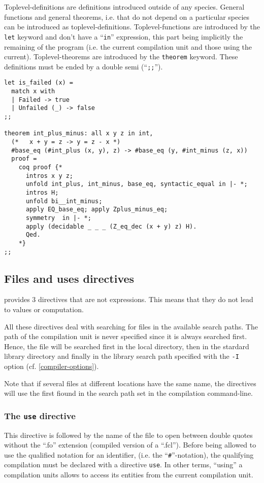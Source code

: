 Toplevel-definitions are definitions introduced outside of any
species. General functions and general theorems, i.e. that do not
depend on a particular species can be introduced as
toplevel-definitions. Toplevel-functions are introduced by the {\tt
  let} keyword and don't have a ``{\tt in}'' expression, this part
being implicitly the remaining of the program (i.e. the current
compilation unit and those using the current).  Toplevel-theorems are
introduced by the {\tt theorem} keyword. These definitions must be ended by a double semi
(``{\tt ;;}'').  {\scriptsize
\begin{lstlisting}
let is_failed (x) =
  match x with
  | Failed -> true
  | Unfailed (_) -> false
;;

theorem int_plus_minus: all x y z in int,
  (*   x + y = z -> y = z - x *)
  #base_eq (#int_plus (x, y), z) -> #base_eq (y, #int_minus (z, x))
  proof =
    coq proof {*
      intros x y z;
      unfold int_plus, int_minus, base_eq, syntactic_equal in |- *;
      intros H;
      unfold bi__int_minus;
      apply EQ_base_eq; apply Zplus_minus_eq;
      symmetry  in |- *;
      apply (decidable _ _ _ (Z_eq_dec (x + y) z) H).
      Qed.
    *}
;;
\end{lstlisting}
}



\subsection{Files and uses directives}
\label{file directive}
{\focal} provides 3 directives that are not expressions. This means
that they do not lead to values or computation.

All these directives deal with searching for files in the available
search paths. The path of the compilation unit is never specified
since it is always searched first. Hence, the file will be searched
first in the local directory, then in the stardard library directory
and finally in the library search path specified with the {\tt -I}
option (cf. \ref{compiler-options}).

Note that if several files at different locations have the same name,
the directives will use the first fiound in the search path set in the
compilation command-line.


\subsubsection{The {\tt use} directive}
This directive is followed by the name of the file to open between
double quotes without the ``.fo'' extension (compiled version of a ``.fcl'').
Before being allowed to use the qualified notation for an identifier,
(i.e. the ``{\tt\#}''-notation), the qualifying compilation must be
declared with a directive {\tt use}. In other terms,
``using'' a compilation units allows to access its entities from the
current compilation unit.


